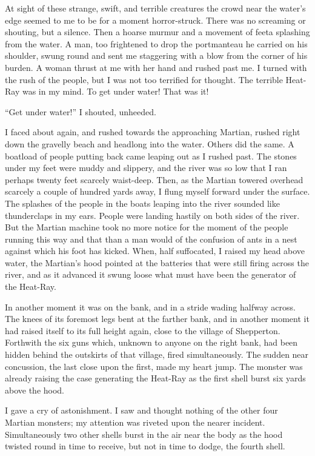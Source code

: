 At sight of these strange, swift, and terrible creatures the crowd
near the water's edge seemed to me to be for a moment
horror-struck. There was no screaming or shouting, but a silence.
Then a hoarse murmur and a movement of feet\dash{}a splashing from the
water. A man, too frightened to drop the portmanteau he carried on
his shoulder, swung round and sent me staggering with a blow from
the corner of his burden. A woman thrust at me with her hand and
rushed past me. I turned with the rush of the people, but I was not
too terrified for thought. The terrible Heat-Ray was in my mind. To
get under water! That was it!

``Get under water!'' I shouted, unheeded.

I faced about again, and rushed towards the approaching Martian,
rushed right down the gravelly beach and headlong into the water.
Others did the same. A boatload of people putting back came leaping
out as I rushed past. The stones under my feet were muddy and
slippery, and the river was so low that I ran perhaps twenty feet
scarcely waist-deep. Then, as the Martian towered overhead scarcely
a couple of hundred yards away, I flung myself forward under the
surface. The splashes of the people in the boats leaping into the
river sounded like thunderclaps in my ears. People were landing
hastily on both sides of the river. But the Martian machine took no
more notice for the moment of the people running this way and that
than a man would of the confusion of ants in a nest against which
his foot has kicked. When, half suffocated, I raised my head above
water, the Martian's hood pointed at the batteries that were still
firing across the river, and as it advanced it swung loose what
must have been the generator of the Heat-Ray.

In another moment it was on the bank, and in a stride wading
halfway across. The knees of its foremost legs bent at the farther
bank, and in another moment it had raised itself to its full height
again, close to the village of Shepperton. Forthwith the six guns
which, unknown to anyone on the right bank, had been hidden behind
the outskirts of that village, fired simultaneously. The sudden
near concussion, the last close upon the first, made my heart jump.
The monster was already raising the case generating the Heat-Ray as
the first shell burst six yards above the hood.

I gave a cry of astonishment. I saw and thought nothing of the
other four Martian monsters; my attention was riveted upon the
nearer incident. Simultaneously two other shells burst in the air
near the body as the hood twisted round in time to receive, but not
in time to dodge, the fourth shell.


